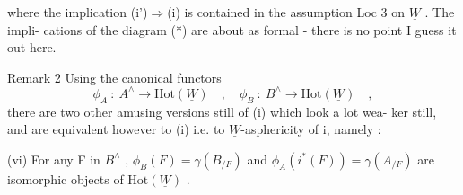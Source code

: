 where the implication  (i')$\Rightarrow$(i)  is contained in the assumption Loc 3
on $\underline{W}$ .   The impli-%
cations of the diagram  (*)  are about as formal  -  there is no point I
guess  it out here.

\uline{Remark 2}   Using the canonical functors
\[ \phi_A \ : \ A^{\wedge} \to \mathrm{Hot}(\underline{W}) \quad , \quad \phi_B \ : \ B^{\wedge} \longrightarrow \mathrm{Hot}(\underline{W}) \quad , \]
there are two other amusing versions still of (i)\hand{,} which  look a lot wea-%
ker still,  and are equivalent however to (i) i.e. to $\underline{W}$-asphericity of i,
namely :

(vi)    For any F in $B^{\wedge}$ ,  $\phi_B(F) = \gamma(B_{/F})$  and  $\phi_A(i^{*}(F)) = \gamma(A_{/F})$
are isomorphic objects of  $\mathrm{Hot}(\underline{W})$ .

